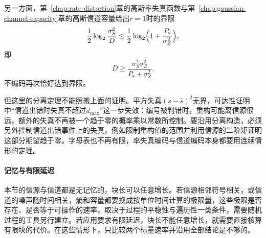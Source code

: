 另一方面，第~\ref{chap:rate-distortion}章的高斯率失真函数与第~\ref{chap:gaussian-channel-capacity}章的高斯信道容量给出$r=1$时的界限
\[
 \frac12\log_2\frac{\sigma_S^{2}}{D}\leq\frac12\log_2\Bigl(1+\frac{P_{\mathrm{s}}}{\sigma_Z^{2}}\Bigr) ,
\]
即
\[
 D\geq\frac{\sigma_S^{2}\sigma_Z^{2}}{P_{\mathrm{s}}+\sigma_Z^{2}} .
\]
不编码再次恰好达到界限。

但这里的分离定理不能照搬上面的证明。平方失真$(s-\hat{s})^{2}$无界，可达性证明中“信道出错时失真不超过$d_{\max}$”这一步失效：编号被判错时，重构可能离信源很远，额外的失真不再被一个趋于零的概率乘以常数所控制。要沿用分离构造，必须另外控制信道出错事件上的失真，例如限制重构值的范围并利用信源的二阶矩证明这部分期望趋于零。字母表也不再有限，率失真编码与信道编码本身都要用连续情形的定理。

\paragraph{记忆与有限延迟}
本节的信源与信道都是无记忆的，块长可以任意增长。若信源相邻符号相关，或信道的噪声随时间相关，熵和容量都要换成按单位时间计算的极限量，这些极限是否存在、是否等于可操作的速率，取决于过程的平稳性与遍历性一类条件，需要随机过程的工具另行建立。若应用要求有限延迟，块长不能任意增长，就需要直接核算有限块的代价。在这些情形下，只比较两个标量速率并沿用全部结论是不够的。
